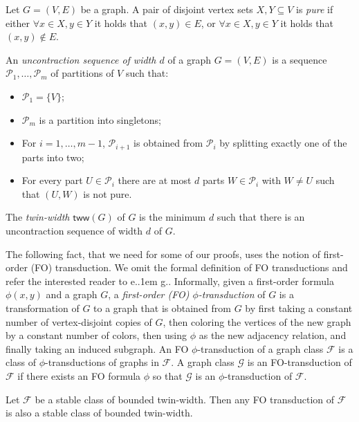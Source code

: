 \documentclass{theoretics}
\makeatletter
\newcommand{\cF}{\ensuremath{\mathcal{F}}}
\newcommand{\cG}{\ensuremath{\mathcal{G}}}
\newcommand{\cP}{\ensuremath{\mathcal{P}}}
\newcommand{\tw}{\mathsf{tww}}
\newcommand*\eg{e.\kern.1em g.\@\xspace} %
\makeatother
\begin{document}
Let $G=(V,E)$ be a graph. A pair of disjoint vertex sets $X,Y \subseteq V$ is \emph{pure} if
either $\forall x \in X, y \in Y$ it holds that $(x,y) \in E$,
or $\forall x \in X, y \in Y$ it holds that $(x,y) \not\in E$.

\begin{definition}
\label{def:twin width}
An \emph{uncontraction sequence of width $d$} of a graph $G=(V,E)$ is a sequence
$\cP_1, \dotsc, \cP_m$ of partitions of $V$ such that:
\begin{itemize}
\item $\cP_1 = \{ V \}$;
\item $\cP_m$ is a partition into singletons;
\item For $i = 1, \dotsc, m-1$, $\cP_{i+1}$ is obtained from $\cP_i$ by splitting exactly one of the
parts into two;
\item For every part $U \in \cP_i$ there are at most $d$ parts $W \in \cP_i$ with $W \neq U$ such
that $(U,W)$ is not pure.
\end{itemize}
The \emph{twin-width} $\tw(G)$ of $G$ is the minimum $d$ such that there is an uncontraction sequence
of width $d$ of $G$.
\end{definition}

\noindent
The following fact, that we need for some of our proofs, uses the notion of first-order (FO) transduction.
We omit the formal definition of FO transductions and refer the interested reader to \eg \cite{GPT21}.
Informally, given a first-order formula $\phi(x,y)$ and a graph $G$, a \emph{first-order (FO) $\phi$-transduction} of $G$ is
a transformation of $G$ to 
a graph that is obtained from $G$ by first taking a constant number of vertex-disjoint copies of $G$, 
then coloring the vertices of the new graph by a constant number of colors, 
then using $\phi$ as the new adjacency relation, 
and finally taking an induced subgraph.
An FO $\phi$-transduction of a graph class $\cF$ is a class of $\phi$-transductions of graphs in $\cF$.
A graph class $\cG$ is an FO-transduction of $\cF$ if there exists an FO formula $\phi$ so that
$\cG$ is an $\phi$-transduction of $\cF$.


\begin{theorem}\label{th:stable-tw-FO}
	Let $\cF$ be a stable class of bounded twin-width. Then any FO transduction of $\cF$ is
	also a stable class of bounded twin-width.
\end{theorem}



\end{document}
